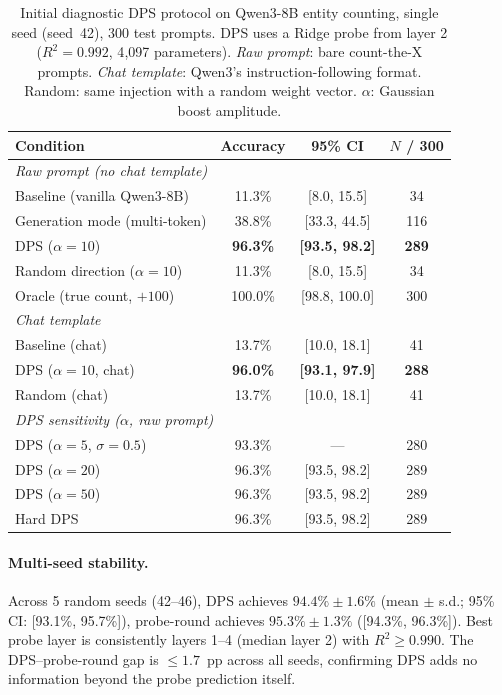 \documentclass{article}
\begin{document}
\begin{table}[h]
\centering
\caption{Initial diagnostic DPS protocol on Qwen3-8B entity counting, single seed (seed~42), 300 test prompts.
DPS uses a Ridge probe from layer 2 ($R^2 = 0.992$, 4{,}097 parameters).
\emph{Raw prompt}: bare count-the-X prompts. \emph{Chat template}: Qwen3's
instruction-following format. Random: same injection with a random weight vector.
$\alpha$: Gaussian boost amplitude.}
\label{tab:dps}
\begin{tabular}{lccc}
\toprule
Condition & Accuracy & 95\% CI & $N$ / 300 \\
\midrule
\multicolumn{4}{l}{\emph{Raw prompt (no chat template)}} \\
Baseline (vanilla Qwen3-8B) & 11.3\% & [8.0, 15.5] & 34 \\
Generation mode (multi-token) & 38.8\% & [33.3, 44.5] & 116 \\
DPS ($\alpha=10$) & \textbf{96.3\%} & \textbf{[93.5, 98.2]} & \textbf{289} \\
Random direction ($\alpha=10$) & 11.3\% & [8.0, 15.5] & 34 \\
Oracle (true count, $+100$) & 100.0\% & [98.8, 100.0] & 300 \\
\midrule
\multicolumn{4}{l}{\emph{Chat template}} \\
Baseline (chat) & 13.7\% & [10.0, 18.1] & 41 \\
DPS ($\alpha=10$, chat) & \textbf{96.0\%} & \textbf{[93.1, 97.9]} & \textbf{288} \\
Random (chat) & 13.7\% & [10.0, 18.1] & 41 \\
\midrule
\multicolumn{4}{l}{\emph{DPS sensitivity ($\alpha$, raw prompt)}} \\
DPS ($\alpha=5$, $\sigma=0.5$) & 93.3\% & --- & 280 \\
DPS ($\alpha=20$) & 96.3\% & [93.5, 98.2] & 289 \\
DPS ($\alpha=50$) & 96.3\% & [93.5, 98.2] & 289 \\
Hard DPS & 96.3\% & [93.5, 98.2] & 289 \\
\bottomrule
\end{tabular}
\end{table}

\paragraph{Multi-seed stability.}
Across 5 random seeds (42--46), DPS achieves $94.4\% \pm 1.6\%$ (mean $\pm$ s.d.;
95\% CI: [93.1\%, 95.7\%]), probe-round achieves $95.3\% \pm 1.3\%$ ([94.3\%, 96.3\%]).
Best probe layer is consistently layers 1--4 (median layer 2) with $R^2 \geq 0.990$.
The DPS--probe-round gap is $\leq 1.7$~pp across all seeds, confirming DPS adds no information
beyond the probe prediction itself.
\end{document}
